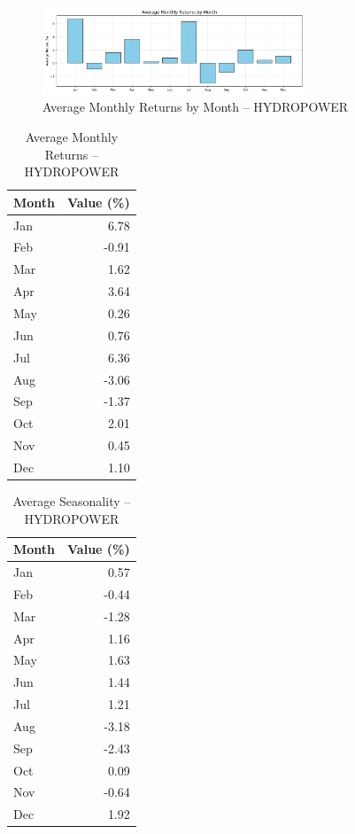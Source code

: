 \documentclass[12pt]{article}
\begin{document}
\begin{figure}[h!]
    \centering
    \includegraphics[width=0.7\textwidth]{decomposition_outputs/HYDROPOWER_avg_monthly_returns.png}
    \caption{Average Monthly Returns by Month -- HYDROPOWER}
\end{figure}

\begin{table}[h!]
\centering
\caption{Average Monthly Returns -- HYDROPOWER}
\begin{tabular}{l r}
\toprule
Month & Value (\%) \\
\midrule
Jan & 6.78 \\
Feb & -0.91 \\
Mar & 1.62 \\
Apr & 3.64 \\
May & 0.26 \\
Jun & 0.76 \\
Jul & 6.36 \\
Aug & -3.06 \\
Sep & -1.37 \\
Oct & 2.01 \\
Nov & 0.45 \\
Dec & 1.10 \\
\bottomrule
\end{tabular}
\end{table}

\begin{table}[h!]
\centering
\caption{Average Seasonality -- HYDROPOWER}
\begin{tabular}{l r}
\toprule
Month & Value (\%) \\
\midrule
Jan & 0.57 \\
Feb & -0.44 \\
Mar & -1.28 \\
Apr & 1.16 \\
May & 1.63 \\
Jun & 1.44 \\
Jul & 1.21 \\
Aug & -3.18 \\
Sep & -2.43 \\
Oct & 0.09 \\
Nov & -0.64 \\
Dec & 1.92 \\
\bottomrule
\end{tabular}
\end{table}
\end{document}
